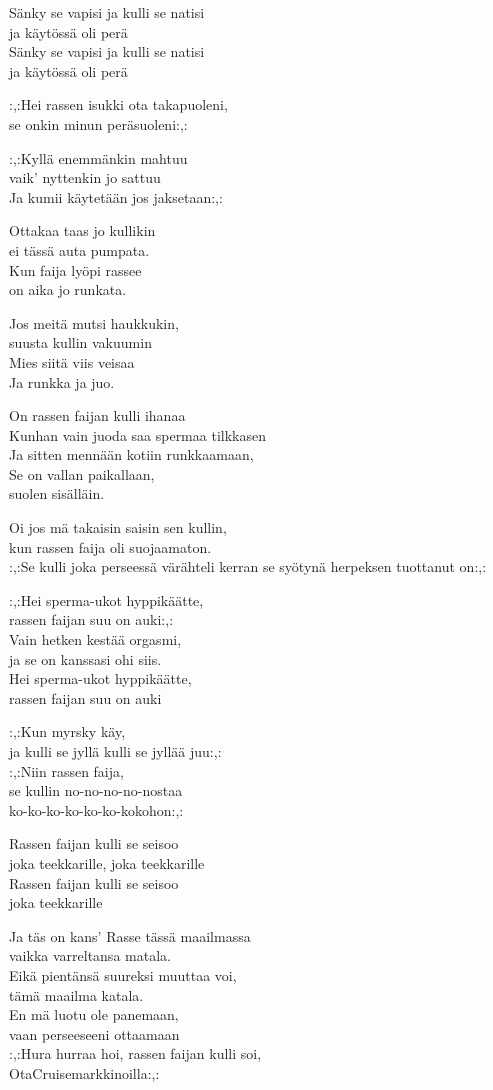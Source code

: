 Sänky se vapisi ja kulli se natisi\\
ja käytössä oli perä\\
Sänky se vapisi ja kulli se natisi\\
ja käytössä oli perä

:,:Hei rassen isukki ota takapuoleni,\\
se onkin minun peräsuoleni:,:

:,:Kyllä enemmänkin mahtuu\\
vaik' nyttenkin jo sattuu\\
Ja kumii käytetään jos jaksetaan:,:

Ottakaa taas jo kullikin\\
ei tässä auta pumpata.\\
Kun faija lyöpi rassee\\
on aika jo runkata.

Jos meitä mutsi haukkukin,\\
suusta kullin vakuumin\\
Mies siitä viis veisaa\\
Ja runkka ja juo.

On rassen faijan kulli ihanaa\\
Kunhan vain juoda saa spermaa tilkkasen\\
Ja sitten mennään kotiin runkkaamaan,\\
Se on vallan paikallaan,\\
suolen sisälläin.

Oi jos mä takaisin saisin sen kullin,\\
kun rassen faija oli suojaamaton.\\
:,:Se kulli joka perseessä värähteli kerran se syötynä herpeksen tuottanut on:,:

:,:Hei sperma-ukot hyppikäätte,\\
rassen faijan suu on auki:,:\\
Vain hetken kestää orgasmi,\\
ja se on kanssasi ohi siis.\\
Hei sperma-ukot hyppikäätte,\\
rassen faijan suu on auki

:,:Kun myrsky käy,\\
ja kulli se jyllä kulli se jyllää juu:,:\\
:,:Niin rassen faija,\\
se kullin no-no-no-no-nostaa\\
ko-ko-ko-ko-ko-ko-kokohon:,:

Rassen faijan kulli se seisoo\\
joka teekkarille, joka teekkarille\\
Rassen faijan kulli se seisoo\\
joka teekkarille

Ja täs on kans' Rasse tässä maailmassa\\
vaikka varreltansa matala.\\
Eikä pientänsä suureksi muuttaa voi,\\
tämä maailma katala.\\
En mä luotu ole panemaan,\\
vaan perseeseeni ottaamaan\\
:,:Hura hurraa hoi, rassen faijan kulli soi,\\
OtaCruisemarkkinoilla:,:
